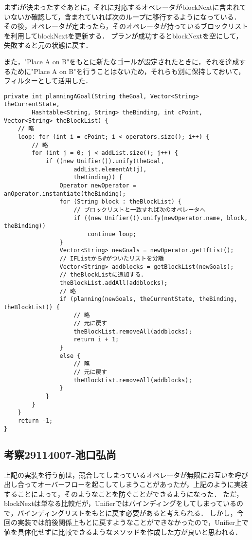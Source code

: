 \documentclass{jarticle}
\begin{document}
まずiが決まったすぐあとに，それに対応するオペレータがblockNextに含まれていないか確認して，含まれていれば次のループに移行するようになっている．
その後，オペレータが定まったら，そのオペレータが持っているブロックリストを利用してblockNextを更新する．
プランが成功するとblockNextを空にして，失敗すると元の状態に戻す．
\newline

また，"Place A on B"をもとに新たなゴールが設定されたときに，それを達成するために"Place A on B"を行うことはないため，それらも別に保持しておいて，フィルターとして活用した．

\begin{lstlisting}[caption=変数まで同じオペレータが呼ばれないようにする,label=src:blockList]
private int planningAGoal(String theGoal, Vector<String> theCurrentState,
        Hashtable<String, String> theBinding, int cPoint, Vector<String> theBlockList) {
    // 略
    loop: for (int i = cPoint; i < operators.size(); i++) {
        // 略
        for (int j = 0; j < addList.size(); j++) {
            if ((new Unifier()).unify(theGoal,
                    addList.elementAt(j),
                    theBinding)) {
                Operator newOperator = anOperator.instantiate(theBinding);
                for (String block : theBlockList) {
                    // ブロックリストと一致すれば次のオペレータへ
                    if ((new Unifier()).unify(newOperator.name, block, theBinding))
                        continue loop;
                }
                Vector<String> newGoals = newOperator.getIfList();
                // IFListから#がついたリストを分離
                Vector<String> addblocks = getBlockList(newGoals);
                // theBlockListに追加する．
                theBlockList.addAll(addblocks);
                // 略
                if (planning(newGoals, theCurrentState, theBinding, theBlockList)) {
                    // 略
                    // 元に戻す
                    theBlockList.removeAll(addblocks);
                    return i + 1;
                }
                else {
                    // 略
                    // 元に戻す
                    theBlockList.removeAll(addblocks);
                }
            }
        }
    }
    return -1;
}
\end{lstlisting}

\subsection{考察29114007-池口弘尚}
上記の実装を行う前は，競合してしまっているオペレータが無限にお互いを呼び出し合ってオーバーフローを起こしてしまうことがあったが，上記のように実装することによって，そのようなことを防ぐことができるようになった．
ただ，blockNextは単なる比較だが，Unifierではバインディングをしてしまっているので，バインディングリストをもとに戻す必要があると考えられる．
しかし，今回の実装では前後関係上もとに戻すようなことができなかったので，Unifier上で値を具体化せずに比較できるようなメソッドを作成した方が良いと思われる．
\end{document}
